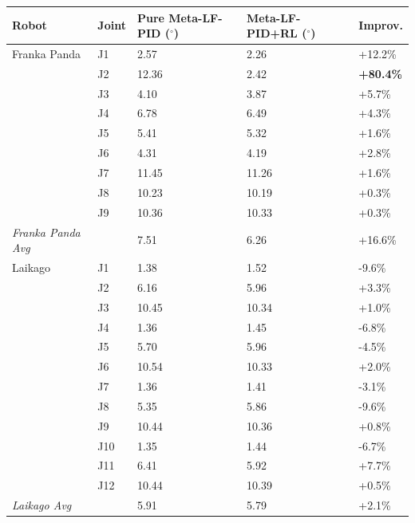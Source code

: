\documentclass[DTMColor]{ROB-New}
\begin{document}
\begin{table}[!htbp]
{\begin{fntable}\centering
\begin{tabular}{@{\extracolsep{\fill}}lllll}
\hline
\textbf{Robot} & \textbf{Joint} & \textbf{Pure Meta-LF-PID ($^\circ$)} & \textbf{Meta-LF-PID+RL ($^\circ$)} & \textbf{Improv.} \\
\hline
Franka Panda    & J1     &   2.57 &   2.26 & +12.2\% \\
                & J2     &  12.36 &   2.42 & \textbf{+80.4\%} \\
                & J3     &   4.10 &   3.87 &  +5.7\% \\
                & J4     &   6.78 &   6.49 &  +4.3\% \\
                & J5     &   5.41 &   5.32 &  +1.6\% \\
                & J6     &   4.31 &   4.19 &  +2.8\% \\
                & J7     &  11.45 &  11.26 &  +1.6\% \\
                & J8     &  10.23 &  10.19 &  +0.3\% \\
                & J9     &  10.36 &  10.33 &  +0.3\% \\
\hline
\textit{Franka Panda Avg} & &   7.51 &   6.26 & +16.6\% \\
\hline
Laikago         & J1     &   1.38 &   1.52 &  -9.6\% \\
                & J2     &   6.16 &   5.96 &  +3.3\% \\
                & J3     &  10.45 &  10.34 &  +1.0\% \\
                & J4     &   1.36 &   1.45 &  -6.8\% \\
                & J5     &   5.70 &   5.96 &  -4.5\% \\
                & J6     &  10.54 &  10.33 &  +2.0\% \\
                & J7     &   1.36 &   1.41 &  -3.1\% \\
                & J8     &   5.35 &   5.86 &  -9.6\% \\
                & J9     &  10.44 &  10.36 &  +0.8\% \\
                & J10    &   1.35 &   1.44 &  -6.7\% \\
                & J11    &   6.41 &   5.92 &  +7.7\% \\
                & J12    &  10.44 &  10.39 &  +0.5\% \\
\hline
\textit{Laikago Avg} & &   5.91 &   5.79 &  +2.1\% \\
\hline
\end{tabular}
\end{fntable}}
\end{table}
\end{document}
